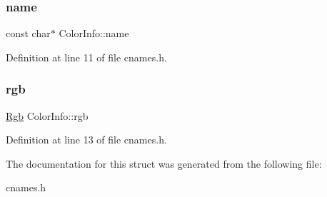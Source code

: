 \subsubsection{\texorpdfstring{name}{name}}
{\footnotesize\ttfamily const char$\ast$ Color\+Info\+::name}



Definition at line 11 of file cnames.\+h.

\mbox{\label{struct_color_info_a088bdf4ce19ae9cc8200062159164dc8}} 
\subsubsection{\texorpdfstring{rgb}{rgb}}
{\footnotesize\ttfamily \hyperlink{palette_8h_struct_rgb}{Rgb} Color\+Info\+::rgb}



Definition at line 13 of file cnames.\+h.



The documentation for this struct was generated from the following file\+:\begin{DoxyCompactItemize}
\item 
cnames.\+h\end{DoxyCompactItemize}
